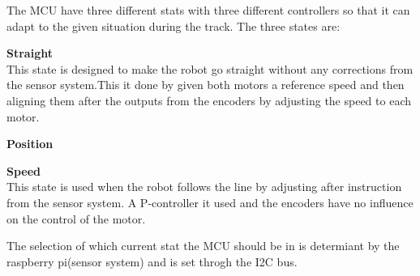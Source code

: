 The MCU have three different stats with three different controllers so that it can adapt to the given situation during the track. The three states are:



\begin{itemize}
	\begin{item}
		\textbf{Straight}\\ This state is designed to make the robot go straight without any corrections from the sensor system.This it done by given both motors a reference speed and then aligning them after the outputs from the encoders by adjusting the speed to each motor. 
	\end{item}
	
	\begin{item}
		\textbf{Position}\\
	\end{item}
	
	\begin{item}
		\textbf{Speed}\\This state is used when the robot follows the line by adjusting after instruction from the sensor system. A P-controller it used and the encoders have no influence on the control of the motor.
	\end{item}

\end{itemize}

The selection of which current stat the MCU should be in is determiant by the raspberry pi(sensor system) and is set throgh the I2C bus.


